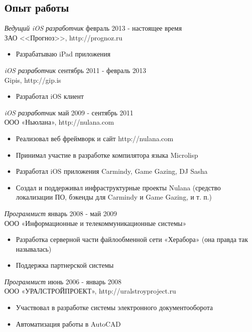 \documentclass[13pt]{res} %
\begin{document}
\begin{resume}
\section{Опыт работы}

{\sl Ведущий iOS разработчик} \hfill февраль 2013 - настоящее время \\
ЗАО <<Прогноз>>, http://prognoz.ru 
\begin{itemize} 
\item Разрабатываю iPad приложения
\end{itemize}

{\sl iOS разработчик} \hfill сентябрь 2011 - февраль 2013 \\
Gipis, http://gip.is 
\begin{itemize} 
\item Разработал iOS клиент
\end{itemize}

{\sl iOS разработчик} \hfill май 2009 - сентябрь 2011 \\
ООО «Ньюлана», http://nulana.com
\begin{itemize} 
\item Реализовал веб фреймворк и сайт http://nulana.com
\item Принимал участие в разработке компилятора языка Microlisp 
\item Разработал iOS приложения Carmindy, Game Gazing, DJ Sasha
\item Создал и поддерживал инфраструктурные проекты Nulana (средство локализации ПО, бэкенды для Carmindy и Game Gazing, и т. п.)
\end{itemize} 

{\sl Программист} \hfill январь 2008 - май 2009 \\
ООО «Информационные и телекоммуникационные системы»
\begin{itemize}
\item Разработка серверной части файлообменной сети «Херабора» (она правда так называлась)
\item Поддержка партнерской системы
\end{itemize} 

{\sl Программист} \hfill июнь 2006 - январь 2008 \\
ООО «УРАЛСТРОЙПРОЕКТ», http://uralstroyproject.ru
\begin{itemize}
\item Участвовал в разработке системы электронного документооборота
\item Автоматизация работы в AutoCAD
\end{itemize} 


\end{resume}
\end{document}
